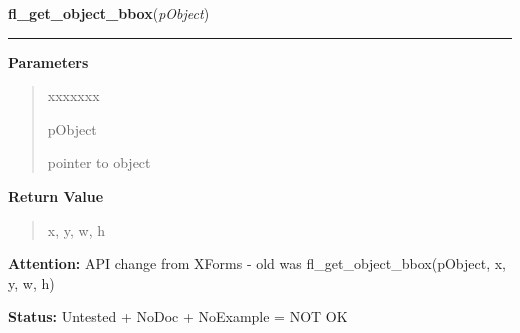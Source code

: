\hspace{.8\funcindent}\begin{boxedminipage}{\funcwidth}

    \raggedright \textbf{fl\_get\_object\_bbox}(\textit{pObject})

    \vspace{-1.5ex}

    \rule{\textwidth}{0.5\fboxrule}
\setlength{\parskip}{2ex}
\setlength{\parskip}{1ex}
      \textbf{Parameters}
      \vspace{-1ex}

      \begin{quote}
        \begin{Ventry}{xxxxxxx}

          \item[pObject]

          pointer to object

        \end{Ventry}

      \end{quote}

      \textbf{Return Value}
    \vspace{-1ex}

      \begin{quote}
      x, y, w, h

      \end{quote}

\textbf{Attention:} API change from XForms - old was fl\_get\_object\_bbox(pObject, x, y, w, h)



\textbf{Status:} Untested + NoDoc + NoExample = NOT OK



    \end{boxedminipage}

    \label{xformslib:library:fl_get_object_bbox}

    \vspace{0.5ex}

